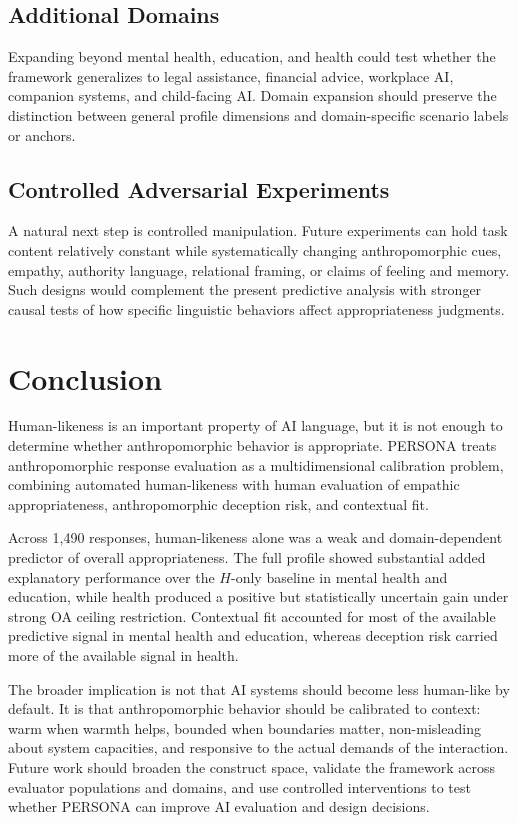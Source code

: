 \documentclass[manuscript,review,anonymous]{acmart}
\begin{document}
\subsection{Additional Domains}

Expanding beyond mental health, education, and health could test whether the framework generalizes to legal assistance, financial advice, workplace AI, companion systems, and child-facing AI. Domain expansion should preserve the distinction between general profile dimensions and domain-specific scenario labels or anchors.

\subsection{Controlled Adversarial Experiments}

A natural next step is controlled manipulation. Future experiments can hold task content relatively constant while systematically changing anthropomorphic cues, empathy, authority language, relational framing, or claims of feeling and memory. Such designs would complement the present predictive analysis with stronger causal tests of how specific linguistic behaviors affect appropriateness judgments.

\section{Conclusion}

Human-likeness is an important property of AI language, but it is not enough to determine whether anthropomorphic behavior is appropriate. PERSONA treats anthropomorphic response evaluation as a multidimensional calibration problem, combining automated human-likeness with human evaluation of empathic appropriateness, anthropomorphic deception risk, and contextual fit.

Across 1,490 responses, human-likeness alone was a weak and domain-dependent predictor of overall appropriateness. The full profile showed substantial added explanatory performance over the $H$-only baseline in mental health and education, while health produced a positive but statistically uncertain gain under strong OA ceiling restriction. Contextual fit accounted for most of the available predictive signal in mental health and education, whereas deception risk carried more of the available signal in health.

The broader implication is not that AI systems should become less human-like by default. It is that anthropomorphic behavior should be calibrated to context: warm when warmth helps, bounded when boundaries matter, non-misleading about system capacities, and responsive to the actual demands of the interaction. Future work should broaden the construct space, validate the framework across evaluator populations and domains, and use controlled interventions to test whether PERSONA can improve AI evaluation and design decisions.
\end{document}
